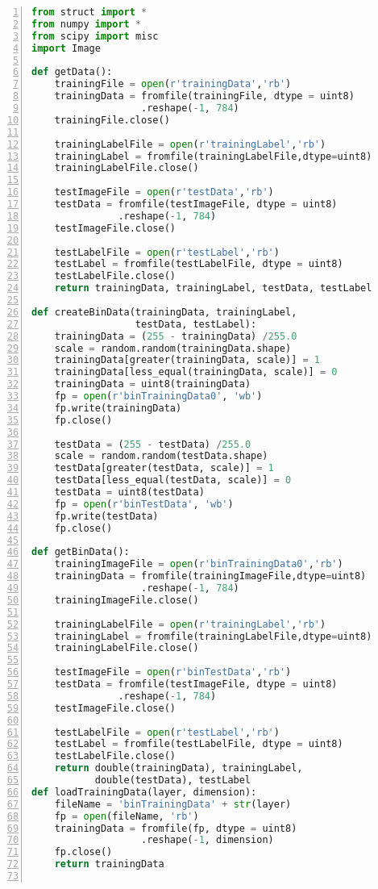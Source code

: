 \begin{lstlisting}[language=Python,numbers=left, frame=shadowbox, rulesepcolor=\color{cadegrey}, caption=\text{MNIST.py}]
from struct import * 
from numpy import *
from scipy import misc
import Image

def getData():
    trainingFile = open(r'trainingData','rb')
    trainingData = fromfile(trainingFile, dtype = uint8)
                   .reshape(-1, 784)
    trainingFile.close()
    
    trainingLabelFile = open(r'trainingLabel','rb')
    trainingLabel = fromfile(trainingLabelFile,dtype=uint8)
    trainingLabelFile.close()
    
    testImageFile = open(r'testData','rb')
    testData = fromfile(testImageFile, dtype = uint8)
               .reshape(-1, 784)
    testImageFile.close()

    testLabelFile = open(r'testLabel','rb')
    testLabel = fromfile(testLabelFile, dtype = uint8)
    testLabelFile.close()   
    return trainingData, trainingLabel, testData, testLabel

def createBinData(trainingData, trainingLabel,
                  testData, testLabel):
    trainingData = (255 - trainingData) /255.0
    scale = random.random(trainingData.shape)
    trainingData[greater(trainingData, scale)] = 1
    trainingData[less_equal(trainingData, scale)] = 0
    trainingData = uint8(trainingData)
    fp = open(r'binTrainingData0', 'wb')
    fp.write(trainingData)
    fp.close()

    testData = (255 - testData) /255.0
    scale = random.random(testData.shape)
    testData[greater(testData, scale)] = 1
    testData[less_equal(testData, scale)] = 0
    testData = uint8(testData)
    fp = open(r'binTestData', 'wb')
    fp.write(testData)
    fp.close()

def getBinData():
    trainingImageFile = open(r'binTrainingData0','rb')
    trainingData = fromfile(trainingImageFile,dtype=uint8)
                   .reshape(-1, 784)
    trainingImageFile.close()
    
    trainingLabelFile = open(r'trainingLabel','rb')
    trainingLabel = fromfile(trainingLabelFile,dtype=uint8)
    trainingLabelFile.close()
    
    testImageFile = open(r'binTestData','rb')
    testData = fromfile(testImageFile, dtype = uint8)
               .reshape(-1, 784)
    testImageFile.close()

    testLabelFile = open(r'testLabel','rb')
    testLabel = fromfile(testLabelFile, dtype = uint8)
    testLabelFile.close()    
    return double(trainingData), trainingLabel, 
           double(testData), testLabel    
def loadTrainingData(layer, dimension):
    fileName = 'binTrainingData' + str(layer)
    fp = open(fileName, 'rb')
    trainingData = fromfile(fp, dtype = uint8)
                   .reshape(-1, dimension)
    fp.close()
    return trainingData
    

\end{lstlisting}
